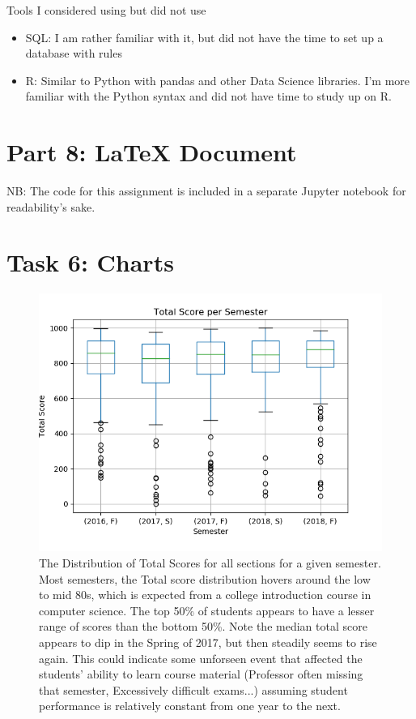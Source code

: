\documentclass[12pt,letterpaper]{article}
\begin{document}
Tools I considered using but did not use
\begin{itemize}
    \item SQL: I am rather familiar with it, but did not have the time to set up a database with rules 
    \item R: Similar to Python with pandas and other Data Science libraries. I'm more familiar with the Python syntax and did not have time to study up on R.
\end{itemize}

\section*{Part 8: LaTeX Document}

NB: The code for this assignment is included in a separate Jupyter notebook for readability's sake.

\section*{Task 6: Charts}

\begin{figure}[!htb]
  \includegraphics[width=\linewidth]{graph0.png}
  \caption{The Distribution of Total Scores for all sections for a given semester. Most semesters, the Total score distribution hovers around the low to mid 80s, which is expected from a college introduction course in computer science. The top 50\% of students appears to have a lesser range of scores than the bottom 50\%. Note the median total score appears to dip in the Spring of 2017, but then steadily seems to rise again. This could indicate some unforseen event that affected the students' ability to learn course material (Professor often missing that semester, Excessively difficult exams...) assuming student performance is relatively constant from one year to the next.}
\end{figure}
\end{document}
